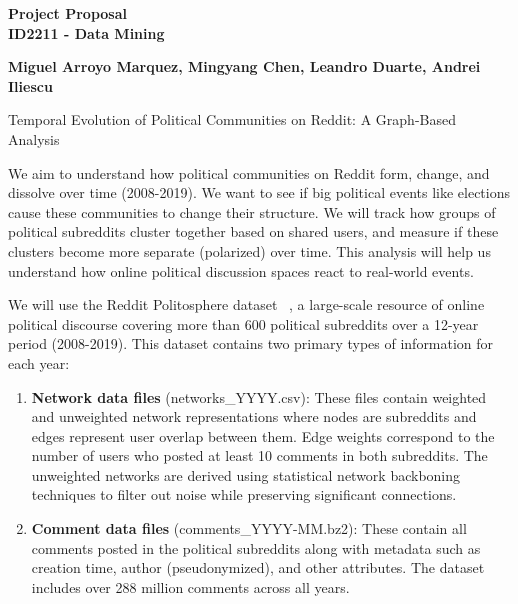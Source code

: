 \documentclass[11pt]{article}
\newcommand{\propitem}[1]{\noindent{\textbf{\color{kthblue}#1:} }}
\begin{document}
\begin{center}
\Large{\textbf{Project Proposal}}\\
\normalsize{\textbf{ID2211 - Data Mining}}\\[0.3cm]
\end{center}

\noindent\makebox[\linewidth]{\rule{\textwidth}{0.4pt}}

\begin{center}
\textbf{Miguel Arroyo Marquez, Mingyang Chen, Leandro Duarte, Andrei Iliescu}
\end{center}

\vspace{0.2cm}

\propitem{Project Title} Temporal Evolution of Political Communities on Reddit: A Graph-Based Analysis

\propitem{Problem Statement} We aim to understand how political communities on Reddit form, change, and dissolve over time (2008-2019). We want to see if big political events like elections cause these communities to change their structure. We will track how groups of political subreddits cluster together based on shared users, and measure if these clusters become more separate (polarized) over time. This analysis will help us understand how online political discussion spaces react to real-world events.

\propitem{Data} We will use the Reddit Politosphere dataset ~\cite{Hofmann_Schütze_Pierrehumbert_2022}, a large-scale resource of online political discourse covering more than 600 political subreddits over a 12-year period (2008-2019). This dataset contains two primary types of information for each year:

\begin{enumerate}
    \item \textbf{Network data files} (networks\_YYYY.csv): These files contain weighted and unweighted network representations where nodes are subreddits and edges represent user overlap between them. Edge weights correspond to the number of users who posted at least 10 comments in both subreddits. The unweighted networks are derived using statistical network backboning techniques to filter out noise while preserving significant connections.
    
    \item \textbf{Comment data files} (comments\_YYYY-MM.bz2): These contain all comments posted in the political subreddits along with metadata such as creation time, author (pseudonymized), and other attributes. The dataset includes over 288 million comments across all years.
\end{enumerate}
\end{document}
